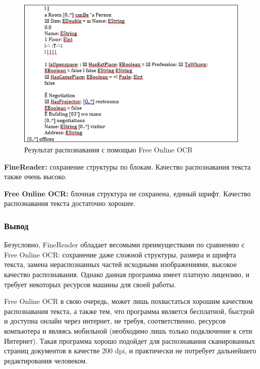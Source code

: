 			\begin{figure}[h]
				\centering
				\includegraphics[width=0.7\linewidth]{images/uml-free-ocr}
				\caption{Результат распознавания с помощью Free Online OCR}
				\label{fig:uml-free-ocr}
			\end{figure}
		
		\FloatBarrier
		
		\textbf{FineReader:} сохранение структуры по блокам. Качество распознавания текста также очень высоко.
		
		\textbf{Free Online OCR:} блочная структура не сохранена, единый шрифт. Качество распознавания текста достаточно хорошее.
		
		\subsubsection{Вывод}
		Безусловно, FineReader обладает весомыми преимуществами по сравнению с Free Online OCR: сохранение даже сложной структуры, размера и шрифта текста, замена нераспознанных частей исходными изображениями, высокое качество распознавания. Однако данная программа имеет платную лицензию, и требует некоторых ресурсов машины для своей работы.
		
		Free Online OCR в свою очередь, может лишь похвастаться хорошим качеством распознавания текста, а также тем, что программа является бесплатной, быстрой и доступна онлайн через интернет, не требуя, соответственно, ресурсов компьютера и являясь мобильной (необходимо лишь только подключение к сети Интернет). Такая программа хорошо подойдет для распознавания сканированных страниц документов в качестве 200 dpi, и практически не потребует дальнейшего редактирования человеком.
		
